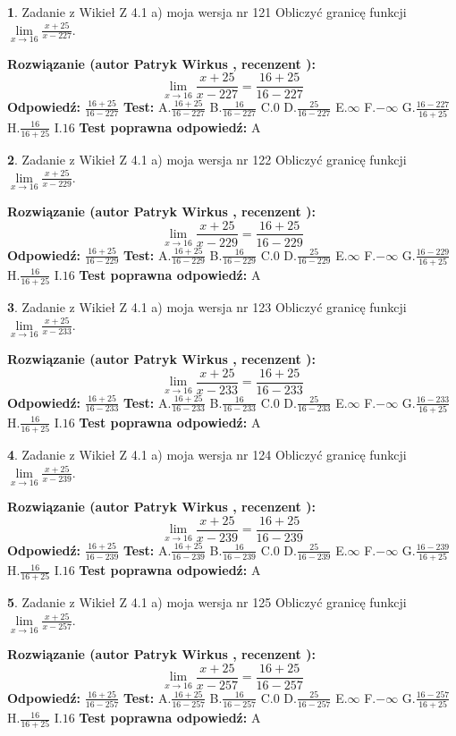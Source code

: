 \documentclass[12pt, a4paper]{article}
\theoremstyle{definition} %
\newtheorem{zad}{}
\newcommand{\zadStart}[1]{\begin{zad}#1\newline}
\newcommand{\zadStop}{\end{zad}}
\newcommand{\rozwStart}[2]{\noindent \textbf{Rozwiązanie (autor #1 , recenzent #2): }\newline}
\newcommand{\rozwStop}{\newline}
\newcommand{\odpStart}{\noindent \textbf{Odpowiedź:}\newline}
\newcommand{\odpStop}{\newline}
\newcommand{\testStart}{\noindent \textbf{Test:}\newline}
\newcommand{\testStop}{\newline}
\newcommand{\kluczStart}{\noindent \textbf{Test poprawna odpowiedź:}\newline}
\newcommand{\kluczStop}{\newline}
\begin{document}
\zadStart{Zadanie z Wikieł Z 4.1 a) moja wersja nr 121}
Obliczyć granicę funkcji $\lim\limits_{x\to16}\frac{x+25}{x-227}$.
\zadStop
\rozwStart{Patryk Wirkus}{}
$$\lim\limits_{x\to16}\frac{x+25}{x-227} = \frac{16+25}{16-227}$$
\rozwStop
\odpStart
$\frac{16+25}{16-227}$
\odpStop
\testStart
A.$\frac{16+25}{16-227}$
B.$\frac{16}{16-227}$
C.$0$
D.$\frac{25}{16-227}$
E.$\infty$
F.$-\infty$
G.$\frac{16-227}{16+25}$
H.$\frac{16}{16+25}$
I.$16$
\testStop
\kluczStart
A
\kluczStop



\zadStart{Zadanie z Wikieł Z 4.1 a) moja wersja nr 122}
Obliczyć granicę funkcji $\lim\limits_{x\to16}\frac{x+25}{x-229}$.
\zadStop
\rozwStart{Patryk Wirkus}{}
$$\lim\limits_{x\to16}\frac{x+25}{x-229} = \frac{16+25}{16-229}$$
\rozwStop
\odpStart
$\frac{16+25}{16-229}$
\odpStop
\testStart
A.$\frac{16+25}{16-229}$
B.$\frac{16}{16-229}$
C.$0$
D.$\frac{25}{16-229}$
E.$\infty$
F.$-\infty$
G.$\frac{16-229}{16+25}$
H.$\frac{16}{16+25}$
I.$16$
\testStop
\kluczStart
A
\kluczStop



\zadStart{Zadanie z Wikieł Z 4.1 a) moja wersja nr 123}
Obliczyć granicę funkcji $\lim\limits_{x\to16}\frac{x+25}{x-233}$.
\zadStop
\rozwStart{Patryk Wirkus}{}
$$\lim\limits_{x\to16}\frac{x+25}{x-233} = \frac{16+25}{16-233}$$
\rozwStop
\odpStart
$\frac{16+25}{16-233}$
\odpStop
\testStart
A.$\frac{16+25}{16-233}$
B.$\frac{16}{16-233}$
C.$0$
D.$\frac{25}{16-233}$
E.$\infty$
F.$-\infty$
G.$\frac{16-233}{16+25}$
H.$\frac{16}{16+25}$
I.$16$
\testStop
\kluczStart
A
\kluczStop



\zadStart{Zadanie z Wikieł Z 4.1 a) moja wersja nr 124}
Obliczyć granicę funkcji $\lim\limits_{x\to16}\frac{x+25}{x-239}$.
\zadStop
\rozwStart{Patryk Wirkus}{}
$$\lim\limits_{x\to16}\frac{x+25}{x-239} = \frac{16+25}{16-239}$$
\rozwStop
\odpStart
$\frac{16+25}{16-239}$
\odpStop
\testStart
A.$\frac{16+25}{16-239}$
B.$\frac{16}{16-239}$
C.$0$
D.$\frac{25}{16-239}$
E.$\infty$
F.$-\infty$
G.$\frac{16-239}{16+25}$
H.$\frac{16}{16+25}$
I.$16$
\testStop
\kluczStart
A
\kluczStop



\zadStart{Zadanie z Wikieł Z 4.1 a) moja wersja nr 125}
Obliczyć granicę funkcji $\lim\limits_{x\to16}\frac{x+25}{x-257}$.
\zadStop
\rozwStart{Patryk Wirkus}{}
$$\lim\limits_{x\to16}\frac{x+25}{x-257} = \frac{16+25}{16-257}$$
\rozwStop
\odpStart
$\frac{16+25}{16-257}$
\odpStop
\testStart
A.$\frac{16+25}{16-257}$
B.$\frac{16}{16-257}$
C.$0$
D.$\frac{25}{16-257}$
E.$\infty$
F.$-\infty$
G.$\frac{16-257}{16+25}$
H.$\frac{16}{16+25}$
I.$16$
\testStop
\kluczStart
A
\kluczStop
\end{document}

